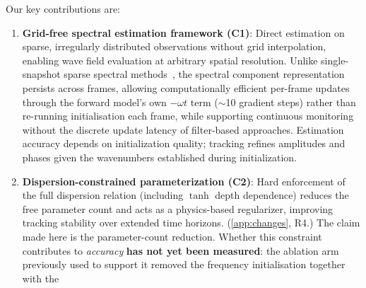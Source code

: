 \documentclass[review]{elsarticle}
\begin{document}
Our key contributions are:
\begin{enumerate}
  \item \textbf{Grid-free spectral estimation framework (C1)}: Direct
    estimation on sparse, irregularly distributed observations without
    grid interpolation, enabling wave field evaluation at arbitrary
    spatial resolution.
    Unlike single-snapshot sparse spectral methods~\citep{donelan1996},
    the spectral component representation persists across frames,
    allowing computationally efficient per-frame updates through the forward
    model's own $-\omega t$ term ($\sim$10 gradient steps)
    rather than re-running initialisation each frame,
    while supporting continuous monitoring without the discrete
    update latency of filter-based approaches.
    Estimation accuracy depends on initialization quality;
    tracking refines amplitudes and phases given the wavenumbers
    established during initialization.
  \item \textbf{Dispersion-constrained parameterization (C2)}: Hard
    enforcement of the full dispersion relation (including $\tanh$
    depth dependence) reduces the free parameter count and acts as a
    physics-based regularizer, improving tracking stability over
    extended time horizons.
    (\ref{app:changes}, R4.) The claim made here is the parameter-count
    reduction. Whether this constraint contributes to \emph{accuracy}
    \textbf{has not yet been measured}: the ablation arm previously used to
    support it removed the frequency initialisation together with the

\end{enumerate}
\end{document}
